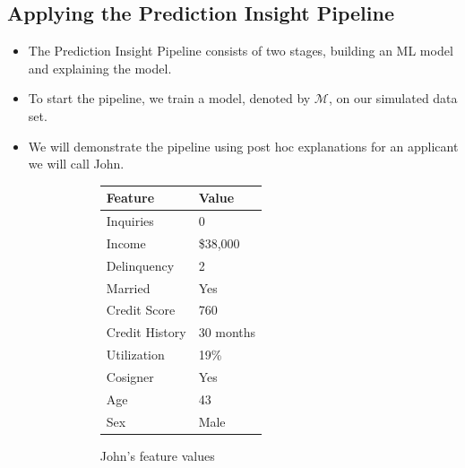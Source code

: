 \documentclass[mnsc,blindrev]{informs3}
\begin{document}
\subsection{Applying the Prediction Insight Pipeline}
\label{sec:applying_to_simulated}
\begin{itemize}
\item The Prediction Insight Pipeline consists of two stages, building an ML model and explaining the model.

\item To start the pipeline, we train a model, denoted by $\mathcal{M}$, on our simulated data set. 

\item We will demonstrate the pipeline using post hoc explanations for an applicant we will call John.

    \begin{figure}[ht!]
        \centering
            \begin{subfigure}[t]{.48\textwidth}
              \centering
                \begin{tabular}[b]{l|l}
                \toprule
                \textbf{Feature} & \textbf{Value} \\ \hline
                Inquiries        & 0              \\
                Income           & \$38,000       \\
                Delinquency      & 2              \\
                Married          & Yes            \\
                Credit Score     & 760            \\
                Credit History   & 30 months      \\
                Utilization      & 19\%           \\
                Cosigner         & Yes            \\
                Age              & 43             \\
                Sex              & Male   \\   \bottomrule
                \end{tabular}
              \caption{John's feature values}
              \label{fig:lime_ex_feat}
            \end{subfigure}%
            \hfill
            \begin{subfigure}[t]{.48\textwidth}

\end{subfigure}
\end{figure}
\end{itemize}
\end{document}
